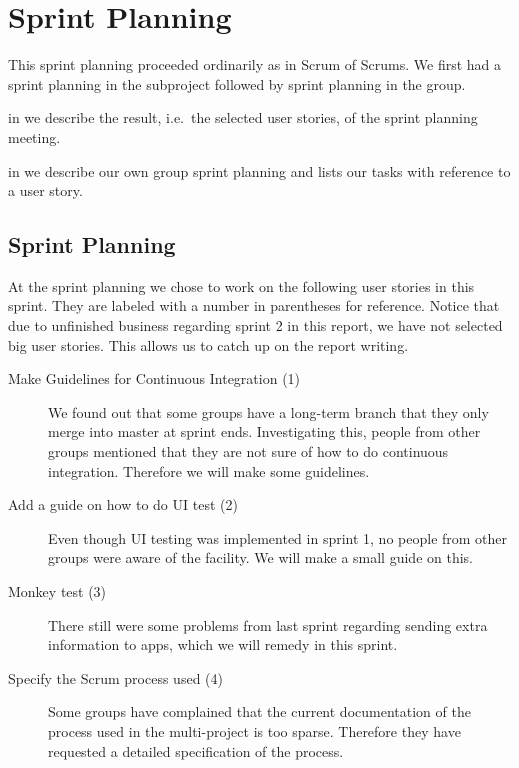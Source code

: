 \chapter{Sprint Planning}\label{chap:s3_sprintplanning}
This sprint planning proceeded ordinarily as in Scrum of Scrums. We first had a sprint planning in the subproject followed by sprint planning in the group.

\begin{chapterorganization}
  \item in  we describe the result, i.e.\ the selected user stories, of the \bd sprint planning meeting.
  \item in  we describe our own group sprint planning and lists our tasks with reference to a user story.
\end{chapterorganization}

\section{\bdtitle Sprint Planning}\label{sec:S3_bd}
At the \bd sprint planning we chose to work on the following user stories in this sprint. They are labeled with a number in parentheses for reference. Notice that due to unfinished business regarding sprint 2 in this report, we have not selected big user stories. This allows us to catch up on the report writing.

\begin{description}
  \item[Make Guidelines for Continuous Integration (1)] We found out that some groups have a long-term branch that they only merge into master at sprint ends. Investigating this, people from other groups mentioned that they are not sure of how to do continuous integration. Therefore we will make some guidelines.
  \item[Add a guide on how to do UI test (2)] Even though UI testing was implemented in sprint 1, no people from other groups were aware of the facility. We will make a small guide on this.
  \item[Monkey test (3)] There still were some problems from last sprint regarding sending extra information to apps, which we will remedy in this sprint.
  \item[Specify the Scrum process used (4)] Some groups have complained that the current documentation of the process used in the multi-project is too sparse. Therefore they have requested a detailed specification of the process.
\end{description}

